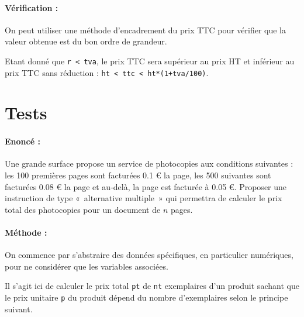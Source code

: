 \documentclass[11pt,a4paper]{article}
\begin{document}
\paragraph{Vérification :} 
On peut utiliser une méthode d'encadrement du prix TTC
pour vérifier que la valeur obtenue est du bon ordre de grandeur.

Etant donné que \texttt{r < tva}, le prix TTC sera supérieur au prix HT et inférieur
au prix TTC sans réduction :
\texttt{ht < ttc < ht*(1+tva/100)}.

\section{Tests}

\paragraph{Enoncé :} 
Une grande surface propose un service de photocopies aux conditions suivantes :
les 100 premières pages sont facturées 0.1 \euro{} la page,
les 500 suivantes sont facturées 0.08 \euro{} la page
et au-delà, la page est facturée à 0.05 \euro{}.
Proposer une instruction de type «~alternative multiple~» 
qui permettra de calculer le prix total des photocopies pour un document 
de $n$ pages.

\paragraph{Méthode :}
On commence par s'abstraire 
des données spécifiques, en particulier numériques, pour ne considérer que les variables associées. 

Il s'agit ici de calculer le prix total \texttt{pt} de \texttt{nt} exemplaires
d'un produit sachant que le prix unitaire \texttt{p} du produit dépend du
nombre d'exemplaires selon le principe suivant.
\end{document}
